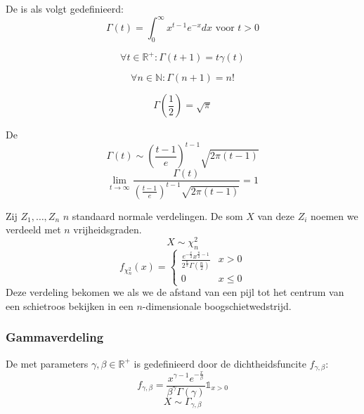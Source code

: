 \documentclass[main.tex]{subfiles}
\begin{document}
\begin{de}
  De  is als volgt gedefinieerd:
  \[
  \Gamma(t) = \int_{0}^{\infty}x^{t-1}e^{-x}dx \text{ voor } t > 0
  \]
\end{de}

\begin{st}
  \[ \forall t \in \mathbb{R}^{+}: \Gamma(t+1) = t\gamma(t) \]
\end{st}

\begin{st}
  \[ \forall n \in \mathbb{N}: \Gamma(n+1) = n! \]
\end{st}

\begin{st}
  \[ \Gamma\left(\frac{1}{2}\right) = \sqrt{\pi} \]
\end{st}

\begin{st}
  De 
  \[
  \Gamma(t) \sim \left(\frac{t-1}{e}\right)^{t-1}\sqrt{2\pi(t-1)}
  \]
  \[
  \lim_{t\rightarrow \infty}\frac{\Gamma(t)}{\left(\frac{t-1}{e}\right)^{t-1}\sqrt{2\pi(t-1)}} = 1
  \]
\end{st}

\begin{de}
  Zij $Z_{1}, \dotsc, Z_{n}$ $n$ standaard normale verdelingen.
  De som $X$ van deze $Z_{i}$ noemen we  verdeeld met $n$ vrijheidsgraden.
  \[ X \sim \chi_{n}^{2} \]
  \[
  f_{\chi^{2}_{n}}(x) =
  \left\{
    \begin{array}{ll}
      \frac{e^{-\frac{x}{2}}x^{\frac{n}{2} - 1}}{2^{\frac{n}{2}}\Gamma\left(\frac{n}{2}\right)} & x > 0\\
      0 & x \le 0
    \end{array}
  \right.
  \]
  Deze verdeling bekomen we als we de afstand van een pijl tot het centrum van een schietroos bekijken in een $n$-dimensionale boogschietwedstrijd.
\end{de}

\subsubsection{Gammaverdeling}
\label{sec:gammaverdeling}

\begin{de}
  De  met parameters $\gamma, \beta \in \mathbb{R}^{+}$ is gedefinieerd door de dichtheidsfuncite $f_{\gamma,\beta}$:
  \[ f_{\gamma,\beta} = \frac{x^{\gamma-1}e^{-\frac{x}{\beta}}}{\beta^{\gamma}\Gamma(\gamma)}\mathbb{1}_{x > 0} \]
  \[ X \sim \Gamma_{\gamma,\beta} \]
\end{de}
\end{document}
